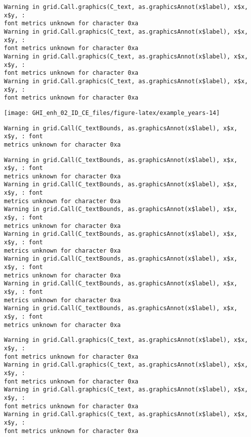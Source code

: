 \documentclass[
  10pt,
  a4paper,oneside]{article}
\begin{document}
\begin{verbatim}
Warning in grid.Call.graphics(C_text, as.graphicsAnnot(x$label), x$x, x$y, :
font metrics unknown for character 0xa
Warning in grid.Call.graphics(C_text, as.graphicsAnnot(x$label), x$x, x$y, :
font metrics unknown for character 0xa
Warning in grid.Call.graphics(C_text, as.graphicsAnnot(x$label), x$x, x$y, :
font metrics unknown for character 0xa
Warning in grid.Call.graphics(C_text, as.graphicsAnnot(x$label), x$x, x$y, :
font metrics unknown for character 0xa
\end{verbatim}

\begin{center}\texttt{[image: GHI\_enh\_02\_ID\_CE\_files/figure-latex/example\_years-14]} \end{center}

\begin{verbatim}
Warning in grid.Call(C_textBounds, as.graphicsAnnot(x$label), x$x, x$y, : font
metrics unknown for character 0xa
\end{verbatim}

\begin{verbatim}
Warning in grid.Call(C_textBounds, as.graphicsAnnot(x$label), x$x, x$y, : font
metrics unknown for character 0xa
Warning in grid.Call(C_textBounds, as.graphicsAnnot(x$label), x$x, x$y, : font
metrics unknown for character 0xa
Warning in grid.Call(C_textBounds, as.graphicsAnnot(x$label), x$x, x$y, : font
metrics unknown for character 0xa
Warning in grid.Call(C_textBounds, as.graphicsAnnot(x$label), x$x, x$y, : font
metrics unknown for character 0xa
Warning in grid.Call(C_textBounds, as.graphicsAnnot(x$label), x$x, x$y, : font
metrics unknown for character 0xa
Warning in grid.Call(C_textBounds, as.graphicsAnnot(x$label), x$x, x$y, : font
metrics unknown for character 0xa
Warning in grid.Call(C_textBounds, as.graphicsAnnot(x$label), x$x, x$y, : font
metrics unknown for character 0xa
\end{verbatim}

\begin{verbatim}
Warning in grid.Call.graphics(C_text, as.graphicsAnnot(x$label), x$x, x$y, :
font metrics unknown for character 0xa
Warning in grid.Call.graphics(C_text, as.graphicsAnnot(x$label), x$x, x$y, :
font metrics unknown for character 0xa
Warning in grid.Call.graphics(C_text, as.graphicsAnnot(x$label), x$x, x$y, :
font metrics unknown for character 0xa
Warning in grid.Call.graphics(C_text, as.graphicsAnnot(x$label), x$x, x$y, :
font metrics unknown for character 0xa
\end{verbatim}
\end{document}
